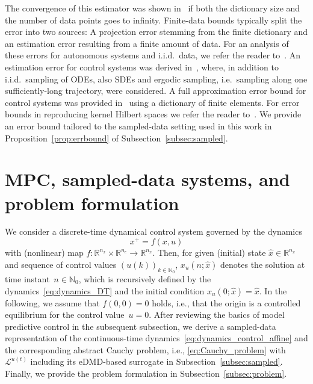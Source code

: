 \documentclass{article}
\numberwithin{equation}{section}
\newcommand{\nx}{n_x}
\newcommand{\nc}{n_c}
\newcommand{\calL}{\mathcal L}
\begin{document}
	The convergence of this estimator was shown in~\cite{KordMezi18a} if both the dictionary size and the number of data points goes to infinity. 
	Finite-data bounds typically split the error into two sources: A projection error stemming from the finite dictionary and an estimation error resulting from a finite amount of data. 
	For an analysis of these errors for autonomous systems and i.i.d.\ data, we refer the reader to~\cite{ZhanZuaz23}. An estimation error for control systems was derived in~\cite{NuskPeit23}, where, in addition to i.i.d.\ sampling of ODEs, also SDEs and ergodic sampling, i.e.\ sampling along one sufficiently-long trajectory, were considered. 
	A full approximation error bound for control systems was provided in~\cite{SchaWort23} using a dictionary of finite elements. For error bounds in reproducing kernel Hilbert spaces we refer the reader to~\cite{PhilScha23}. We provide an error bound tailored to the sampled-data setting used in this work in Proposition~\ref{prop:errbound} of Subsection~\ref{subsec:sampled}.
	
	
	
	
	
	\section{MPC, sampled-data systems, and problem formulation}
	\label{sec:problem}
	
	\noindent We consider a discrete-time dynamical control system governed by the dynamics
	\begin{equation}\label{eq:dynamics_DT}
	x^+ = f(x,u)    
	\end{equation}
	with (nonlinear) map $f: \mathbb{R}^{\nx} \times \mathbb{R}^{\nc} \rightarrow \mathbb{R}^{\nx}$.
	Then, for given (initial) state $\hat{x} \in \mathbb{R}^{\nx}$ and sequence of control values $(u(k))_{k \in \mathbb{N}_0}$, $x_u(n;\hat{x})$ denotes the solution at time instant~$n \in \mathbb{N}_0$, which is recursively defined by the dynamics~\eqref{eq:dynamics_DT} and the initial condition $x_u(0;\hat{x}) = \hat{x}$. 
	In the following, we assume that $f(0,0) = 0$ holds, i.e., that the origin is a controlled equilibrium for the control value~$u = 0$. 
	After reviewing the basics of model predictive control in the subsequent subsection, we derive a sampled-data representation of the continuous-time dynamics~\eqref{eq:dynamics_control_affine} and the corresponding abstract Cauchy problem, i.e., \eqref{eq:Cauchy_problem} with $\calL^{u(t)}$ including its eDMD-based surrogate in Subsection~\ref{subsec:sampled}. 
	Finally, we provide the problem formulation in Subsection~\ref{subsec:problem}.
	
\end{document}
